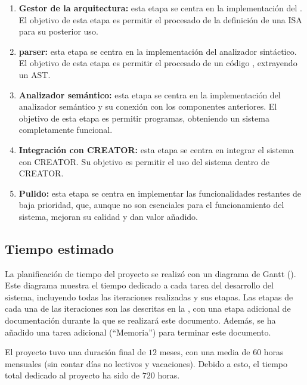 \begin{enumerate}[label=\Roman*.]
    \item \textbf{Gestor de la arquitectura:} esta etapa se centra en la
    implementación del . El objetivo de
    esta etapa es permitir el procesado de la definición de una \gls{ISA} para
    su posterior uso.
    \item \textbf{\Gls{parser}:} esta etapa se centra en la implementación del
    analizador sintáctico. El objetivo de esta etapa es permitir el procesado de
    un código , extrayendo un \gls{AST}.
    \item \textbf{Analizador semántico:} esta etapa se centra en la implementación
    del analizador semántico y su conexión con los componentes anteriores.
    El objetivo de esta etapa es permitir 
    programas, obteniendo un sistema completamente funcional.
    \item \textbf{Integración con CREATOR:} esta etapa se centra en integrar el
    sistema con CREATOR. Su objetivo es permitir el uso del sistema dentro de
    CREATOR.
    \item \textbf{Pulido:} esta etapa se centra en implementar las
    funcionalidades restantes de baja prioridad, que, aunque no son esenciales
    para el funcionamiento del sistema, mejoran su calidad y dan valor añadido.
\end{enumerate}

\subsection{Tiempo estimado}

La planificación de tiempo del proyecto se realizó con un diagrama de Gantt
\parencite{gantt} (). Este diagrama muestra el tiempo dedicado a
cada tarea del desarrollo del sistema, incluyendo todas las iteraciones
realizadas y sus etapas. Las etapas de cada una de las iteraciones son las
descritas en la , con una etapa adicional de
documentación durante la que se realizará este documento. Además, se ha añadido
una tarea adicional (``Memoria'') para terminar este documento.

El proyecto tuvo una duración final de $12$ meses, con una media de $60$ horas
mensuales (sin contar días no lectivos y vacaciones). Debido a esto, el tiempo
total dedicado al proyecto ha sido de $720$ horas.

